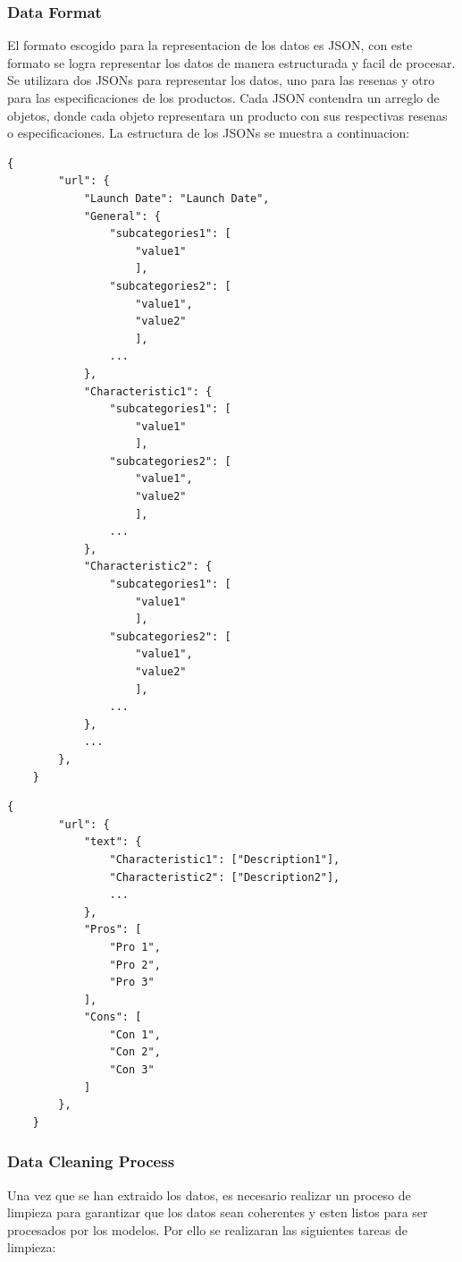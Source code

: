 \subsubsection{Data Format}
El formato escogido para la representacion de los datos es JSON, con este formato se logra representar los datos de manera estructurada y facil de procesar. Se utilizara dos JSONs para representar los datos, uno para las resenas y otro para las especificaciones de los productos. Cada JSON contendra un arreglo de objetos, donde cada objeto representara un producto con sus respectivas resenas o especificaciones. La estructura de los JSONs se muestra a continuacion:
\newpage
\begin{lstlisting}[style=jsonstyle, frame = single, caption=JSON Data Format Product specification, label=code:json-data-format]
    {
        "url": {
            "Launch Date": "Launch Date",
            "General": {
                "subcategories1": [
                    "value1"
                    ],
                "subcategories2": [
                    "value1",
                    "value2"
                    ],
                ...
            },
            "Characteristic1": {
                "subcategories1": [
                    "value1"
                    ],
                "subcategories2": [
                    "value1",
                    "value2"
                    ],
                ...
            },
            "Characteristic2": {
                "subcategories1": [
                    "value1"
                    ],
                "subcategories2": [
                    "value1",
                    "value2"
                    ],
                ...
            },
            ...
        },
    }
\end{lstlisting}
\newpage
\begin{lstlisting}[style=jsonstyle, frame = single, caption=JSON Data Format reviews, label=code:json-data-format]
    {
        "url": {
            "text": {
                "Characteristic1": ["Description1"],
                "Characteristic2": ["Description2"],
                ...
            },
            "Pros": [
                "Pro 1",
                "Pro 2",
                "Pro 3"
            ],
            "Cons": [
                "Con 1",
                "Con 2",
                "Con 3"
            ]
        },
    }
    \end{lstlisting}

\subsubsection{Data Cleaning Process}
Una vez que se han extraido los datos, es necesario realizar un proceso de limpieza para garantizar que los datos sean coherentes y esten listos para ser procesados por los modelos. Por ello se realizaran las siguientes tareas de limpieza:


